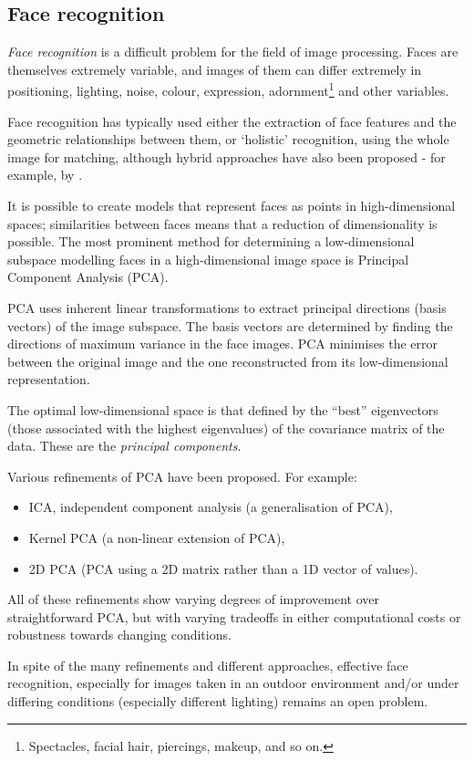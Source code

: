 \subsection{Face recognition}
\label{sec:face-rec-prior}

\emph{Face recognition} is a difficult problem for the field of image
processing. Faces are themselves extremely variable, and images of them can
differ extremely in positioning, lighting, noise, colour, expression,
adornment\footnote{Spectacles, facial hair, piercings, makeup, and so on.} and other
variables.

Face recognition has typically used either the extraction of face features and
the geometric relationships between them, or `holistic' recognition, using the
whole image for matching, \cite{eigenfaces} although hybrid approaches have also
been proposed - for example, by \citet{zhao03:_face}.

It is possible to create models that represent faces as points in
high-dimensional spaces; similarities between faces means that a reduction of
dimensionality is possible. The most prominent method for determining a
low-dimensional subspace modelling faces in a high-dimensional image space is
Principal Component Analysis (PCA). \cite{eigenfaces}

PCA uses inherent linear transformations to extract principal directions (basis
vectors) of the image subspace. \cite{pca} The basis vectors are determined by
finding the directions of maximum variance in the face images. PCA minimises the
error between the original image and the one reconstructed from its
low-dimensional representation.

The optimal low-dimensional space is that defined by the ``best'' eigenvectors
(those associated with the highest eigenvalues) of the covariance matrix of the
data. These are the \emph{principal components}. \cite{pca}

Various refinements of PCA have been proposed. For example:
\begin{itemize}
\item ICA, independent component
analysis (a generalisation of PCA), \cite{bartlett02:_face}
\item Kernel PCA (a non-linear extension of PCA), \cite{kim02:_face}
\item 2D PCA (PCA using a 2D matrix rather than a 1D vector of values). \cite{yang04:_two_pca}
\end{itemize}
All of these refinements show varying degrees of improvement over straightforward PCA, but with
varying tradeoffs in either computational costs or robustness towards changing
conditions. \cite{yang04:_two_pca}

In spite of the many refinements and different approaches, effective face
recognition, especially for images taken in an outdoor environment and/or under
differing conditions (especially different lighting) remains an open problem.
\cite{zhao03:_face}
